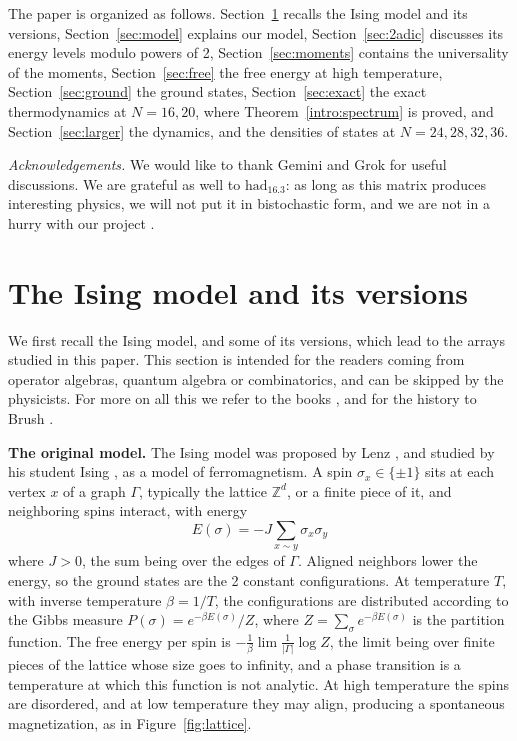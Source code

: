 \documentclass[11pt,a4paper]{article}
\theoremstyle{remark}
\begin{document}
The paper is organized as follows. Section~\ref{sec:ising} recalls the Ising model and its versions, Section~\ref{sec:model} explains our model, Section~\ref{sec:2adic} discusses its energy levels modulo powers of 2, Section~\ref{sec:moments} contains the universality of the moments, Section~\ref{sec:free} the free energy at high temperature, Section~\ref{sec:ground} the ground states, Section~\ref{sec:exact} the exact thermodynamics at $N=16,20$, where Theorem~\ref{intro:spectrum} is proved, and Section~\ref{sec:larger} the dynamics, and the densities of states at $N=24,28,32,36$.

\medskip

{\em Acknowledgements.} We would like to thank Gemini and Grok for useful discussions. We are grateful as well to $\mathrm{had}_{16.3}$: as long as this matrix produces interesting physics, we will not put it in bistochastic form, and we are not in a hurry with our project \cite{com}.

\section{The Ising model and its versions}\label{sec:ising}

We first recall the Ising model, and some of its versions, which lead to the arrays studied in this paper. This section is intended for the readers coming from operator algebras, quantum algebra or combinatorics, and can be skipped by the physicists. For more on all this we refer to the books \cite{bax,mpv}, and for the history to Brush \cite{bru}.

\medskip

\noindent\textbf{The original model.} The Ising model was proposed by Lenz \cite{len}, and studied by his student Ising \cite{isi}, as a model of ferromagnetism. A spin $\sigma_x\in\{\pm1\}$ sits at each vertex $x$ of a graph $\Gamma$, typically the lattice $\mathbb Z^d$, or a finite piece of it, and neighboring spins interact, with energy
\[
 E(\sigma)=-J\sum_{x\sim y}\sigma_x\sigma_y
\]
where $J>0$, the sum being over the edges of $\Gamma$. Aligned neighbors lower the energy, so the ground states are the 2 constant configurations. At temperature $T$, with inverse temperature $\beta=1/T$, the configurations are distributed according to the Gibbs measure $P(\sigma)=e^{-\beta E(\sigma)}/Z$, where $Z=\sum_\sigma e^{-\beta E(\sigma)}$ is the partition function. The free energy per spin is $-\frac{1}{\beta}\lim\frac{1}{|\Gamma|}\log Z$, the limit being over finite pieces of the lattice whose size goes to infinity, and a phase transition is a temperature at which this function is not analytic. At high temperature the spins are disordered, and at low temperature they may align, producing a spontaneous magnetization, as in Figure~\ref{fig:lattice}.
\end{document}

